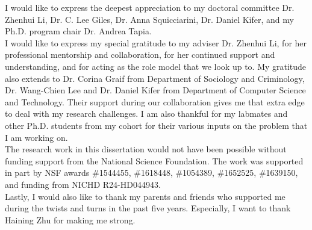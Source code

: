 

I would like to express the deepest appreciation to my doctoral committee Dr. Zhenhui Li, Dr. C. Lee Giles, Dr. Anna Squicciarini, Dr. Daniel Kifer, and my Ph.D. program chair Dr. Andrea Tapia. \\

I would like to express my special gratitude to my adviser Dr. Zhenhui Li, for her professional mentorship and collaboration, for her continued support and understanding, and for acting as the role model that we look up to. My gratitude also extends to Dr. Corina Graif from Department of Sociology and Criminology, Dr. Wang-Chien Lee and Dr. Daniel Kifer from Department of Computer Science and Technology. Their support during our collaboration gives me that extra edge to deal with my research challenges. I am also thankful for my labmates and other Ph.D. students from my cohort for their various inputs on the problem that I am working on. \\

The research work in this dissertation would not have been possible without funding support from the National Science Foundation. The work was supported in part by NSF awards \#1544455, \#1618448, \#1054389, \#1652525, \#1639150, and funding from NICHD R24-HD044943. \\

Lastly, I would also like to thank my parents and friends who supported me during the twists and turns in the past five years. Especially, I want to thank Haining Zhu for making me strong.